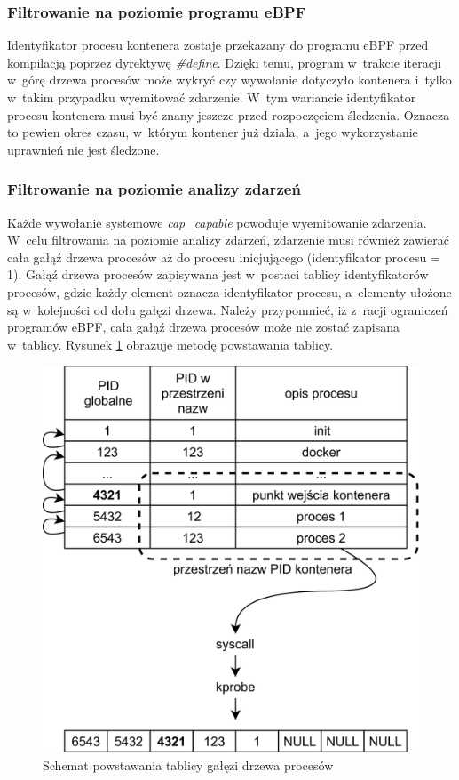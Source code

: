 \subsubsection{Filtrowanie na poziomie programu eBPF}

Identyfikator procesu kontenera zostaje przekazany do programu eBPF przed kompilacją poprzez dyrektywę \textit{\#define}. Dzięki temu, program w~trakcie iteracji w~górę drzewa procesów może wykryć czy wywołanie dotyczyło kontenera i~tylko w~takim przypadku wyemitować zdarzenie. W~tym wariancie identyfikator procesu kontenera musi być znany jeszcze przed rozpoczęciem śledzenia. Oznacza to pewien okres czasu, w~którym kontener już działa, a~jego wykorzystanie uprawnień nie jest śledzone.

\subsubsection{Filtrowanie na poziomie analizy zdarzeń}

Każde wywołanie systemowe \textit{cap_capable} powoduje wyemitowanie zdarzenia. W~celu filtrowania na poziomie analizy zdarzeń, zdarzenie musi również zawierać cała gałąź drzewa procesów aż do procesu inicjującego (identyfikator procesu = 1). Gałąź drzewa procesów zapisywana jest w~postaci tablicy identyfikatorów procesów, gdzie każdy element oznacza identyfikator procesu, a~elementy ułożone są w~kolejności od dołu gałęzi drzewa. Należy przypomnieć, iż z~racji ograniczeń programów eBPF, cała gałąź drzewa procesów może nie zostać zapisana w~tablicy. Rysunek \ref{fig:analyzerPIDs} obrazuje metodę powstawania tablicy.

\begin{figure}[ht]
    \centering
    \includegraphics[width=0.9\linewidth]{images/analyzerPIDs.png}
    \caption{Schemat powstawania tablicy gałęzi drzewa procesów}
    \label{fig:analyzerPIDs}
\end{figure}

